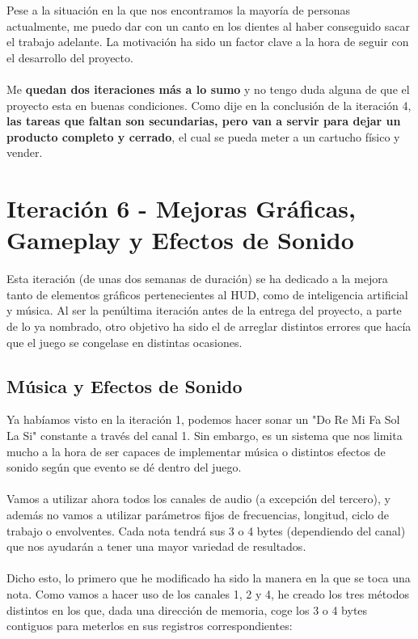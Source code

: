 Pese a la situación en la que nos encontramos la mayoría de personas actualmente, me puedo dar con un canto en los dientes al haber conseguido sacar el trabajo adelante. La motivación ha sido un factor clave a la hora de seguir con el desarrollo del proyecto.
\\ \\
Me \textbf{quedan dos iteraciones más a lo sumo} y no tengo duda alguna de que el proyecto esta en buenas condiciones. Como dije en la conclusión de la iteración 4, \textbf{las tareas que faltan son secundarias, pero van a servir para dejar un producto completo y cerrado}, el cual se pueda meter a un cartucho físico y vender.

\clearpage

\section{Iteración 6 - Mejoras Gráficas, Gameplay y Efectos de Sonido}

Esta iteración (de unas dos semanas de duración) se ha dedicado a la mejora tanto de elementos gráficos pertenecientes al HUD, como de inteligencia artificial y música. Al ser la penúltima iteración antes de la entrega del proyecto, a parte de lo ya nombrado, otro objetivo ha sido el de arreglar distintos errores que hacía que el juego se congelase en distintas ocasiones.

\subsection{Música y Efectos de Sonido}

Ya habíamos visto en la iteración 1, podemos hacer sonar un "Do Re Mi Fa Sol La Si" constante a través del canal 1. Sin embargo, es un sistema que nos limita mucho a la hora de ser capaces de implementar música o distintos efectos de sonido según que evento se dé dentro del juego.
\\ \\
Vamos a utilizar ahora todos los canales de audio (a excepción del tercero), y además no vamos a utilizar parámetros fijos de frecuencias, longitud, ciclo de trabajo o envolventes. Cada nota tendrá sus 3 o 4 bytes (dependiendo del canal) que nos ayudarán a tener una mayor variedad de resultados.
\\ \\
Dicho esto, lo primero que he modificado ha sido la manera en la que se toca una nota. Como vamos a hacer uso de los canales 1, 2 y 4, he creado los tres métodos distintos en los que, dada una dirección de memoria, coge los 3 o 4 bytes contiguos para meterlos en sus registros correspondientes:

